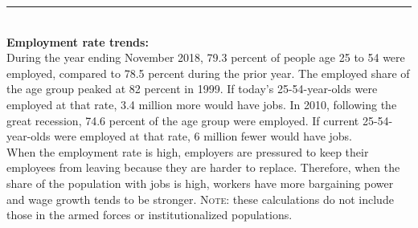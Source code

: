 \documentclass{report}
\newcommand{\dateaxisticks}{
		axis line style={draw=none},
		max space between ticks=38,	 
		xmin={1997-01-01},
		xtick={
			{1995-01-01},
			{2000-01-01},
			{2005-01-01},
			{2010-01-01},
			{2015-01-01}},
	    minor xtick={
	    	{1994-01-01}, {1996-01-01}, {1997-01-01}, {1998-01-01}, {1999-01-01},
			{2001-01-01}, {2002-01-01}, {2003-01-01}, {2004-01-01}, 
	    	{2006-01-01}, {2007-01-01}, {2008-01-01}, {2009-01-01},
	      	{2011-01-01}, {2012-01-01}, {2013-01-01}, {2014-01-01},
	      	{2016-01-01}, {2017-01-01}, {2018-01-01}, {2019-01-01}},
	    enlarge y limits={0.08},
	    enlarge x limits={0.12},}
\newcommand{\lastpt}[1]{node[circle, 
		minimum size=3pt, inner sep=0pt, draw, fill, pos=1](#1){};}
\begin{document}
\noindent \begin{minipage}[t]{0.48\textwidth}

\noindent \textcolor{blue}{\rule[-6pt]{90mm}{24pt}}
		\vspace{-6mm}
		
		\hspace{1mm} \textcolor{white}{}
\vspace{1.1mm}

\hspace{0.8mm} 
\vspace{4mm}\\
\textbf{Employment rate trends:}
\vspace{2mm}\\
During the year ending November 2018, 79.3 percent of people age 25 to 54 were employed, compared to 78.5 percent during the prior year. The employed share of the age group peaked at 82 percent in 1999. If today's 25-54-year-olds were employed at that rate, 3.4 million more would have jobs. In 2010, following the great recession, 74.6 percent of the age group were employed. If current 25-54-year-olds were employed at that rate, 6 million fewer would have jobs.\\

When the employment rate is high, employers are pressured to keep their employees from leaving because they are harder to replace. Therefore, when the share of the population with jobs is high, workers have more bargaining power and wage growth tends to be stronger. \textsc{Note:} these calculations do not include those in the armed forces or institutionalized populations.\\
\end{minipage}\hfill
\end{document}
